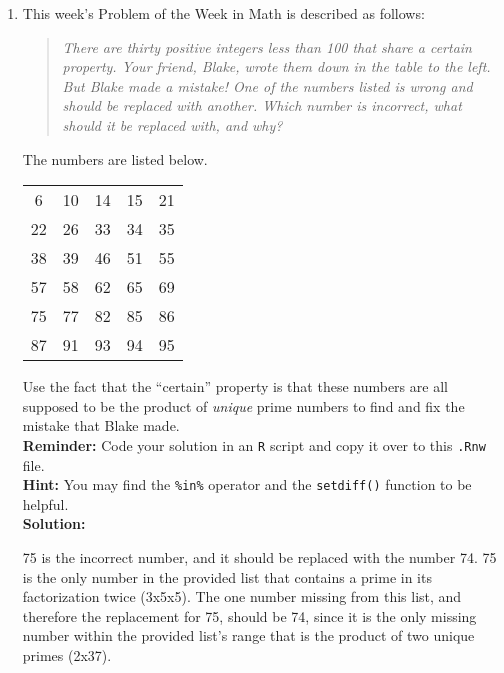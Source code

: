 \documentclass{article}\usepackage[]{graphicx}\usepackage[]{xcolor}
\begin{document}
\begin{enumerate}
\item This week's Problem of the Week in Math is described as follows:
\begin{quotation}
  \textit{There are thirty positive integers less than 100 that share a certain 
  property. Your friend, Blake, wrote them down in the table to the left. But 
  Blake made a mistake! One of the numbers listed is wrong and should be replaced 
  with another. Which number is incorrect, what should it be replaced with, and 
  why?}
\end{quotation}
The numbers are listed below.
\begin{center}
  \begin{tabular}{ccccc}
    6 & 10 & 14 & 15 & 21\\
    22 & 26 & 33 & 34 & 35\\
    38 & 39 & 46 & 51 & 55\\
    57 & 58 & 62 & 65 & 69\\
    75 & 77 & 82 & 85 & 86\\
    87 & 91 & 93 & 94 & 95
  \end{tabular}
\end{center}
Use the fact that the ``certain'' property is that these numbers are all supposed
to be the product of \emph{unique} prime numbers to find and fix the mistake that
Blake made.\\
\textbf{Reminder:} Code your solution in an \texttt{R} script and copy it over
to this \texttt{.Rnw} file.\\
\textbf{Hint:} You may find the \verb|%in%| operator and the \verb|setdiff()| function to be helpful.\\

\textbf{Solution:} 

75 is the incorrect number, and it should be replaced with the number 74. 75 is the only number in the provided list that contains a prime in its factorization twice (3x5x5). The one number missing from this list, and therefore the replacement for 75, should be 74, since it is the only missing number within the provided list's range that is the product of two unique primes (2x37).


\end{enumerate}
\end{document}
